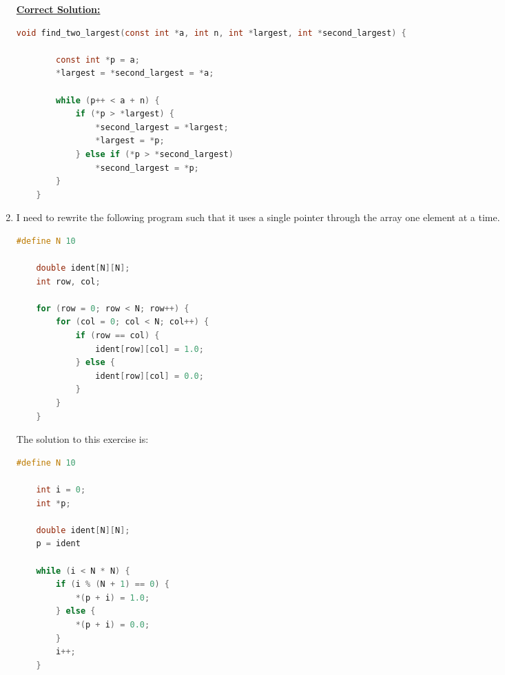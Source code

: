 \documentclass[12pt]{article}
\begin{document}
\begin{enumerate}[1.]
    \bigskip

    \begin{mdframed}

    \underline{\textbf{Correct Solution:}}

    \bigskip

\begin{lstlisting}[language=c]
    void find_two_largest(const int *a, int n, int *largest, int *second_largest) {

        const int *p = a;
        *largest = *second_largest = *a;

        while (p++ < a + n) {
            if (*p > *largest) {
                *second_largest = *largest;
                *largest = *p;
            } else if (*p > *second_largest)
                *second_largest = *p;
        }
    }
\end{lstlisting}

    \end{mdframed}

    \item

    I need to rewrite the following program such that it uses a single pointer through
    the array one element at a time.

    \bigskip

\begin{lstlisting}[language=c]
    #define N 10

    double ident[N][N];
    int row, col;

    for (row = 0; row < N; row++) {
        for (col = 0; col < N; col++) {
            if (row == col) {
                ident[row][col] = 1.0;
            } else {
                ident[row][col] = 0.0;
            }
        }
    }
\end{lstlisting}

    \bigskip

    The solution to this exercise is:

    \bigskip

\begin{lstlisting}[language=c]
    #define N 10

    int i = 0;
    int *p;

    double ident[N][N];
    p = ident

    while (i < N * N) {
        if (i % (N + 1) == 0) {
            *(p + i) = 1.0;
        } else {
            *(p + i) = 0.0;
        }
        i++;
    }
\end{lstlisting}



\end{enumerate}
\end{document}
